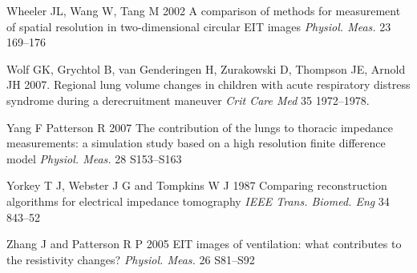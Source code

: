 \documentclass[12pt]{iopart}
\begin{document}
\item[]
Wheeler JL, Wang W, Tang M 2002
A comparison of methods for measurement of spatial resolution in two-dimensional circular EIT images
{\em Physiol. Meas.}
23 169--176

\item[]
Wolf GK, Grychtol B, van Genderingen H, Zurakowski D, Thompson JE, Arnold JH
2007.
Regional lung volume changes in children with acute respiratory distress
syndrome during a derecruitment maneuver
{\em Crit Care Med}
35 1972--1978.

\item[]
Yang F  Patterson R 2007
The contribution of the lungs to thoracic impedance
measurements: a simulation study based on a high
resolution finite difference model
{\em Physiol. Meas.}
28 S153--S163

\item[]
Yorkey T J, Webster J G and Tompkins W J 1987
Comparing reconstruction algorithms for electrical
impedance tomography
{\em IEEE Trans. Biomed. Eng}
34 843--52


\item[]
Zhang J and Patterson R P 2005 EIT images of ventilation: what
contributes to the resistivity changes?
{\em Physiol. Meas.}
 26 S81--S92

\endrefs
\end{document}
